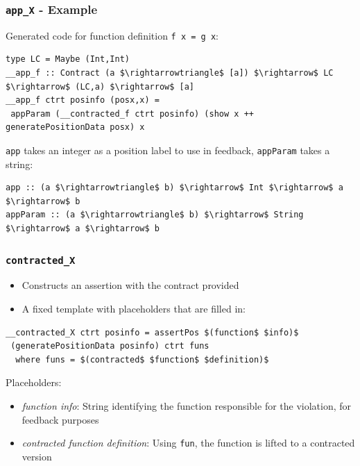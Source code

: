 \documentclass[]{beamer}
\begin{document}
\begin{frame}[fragile]
\frametitle{\texttt{\underline{\hspace{1.5em}}app\_X} - Example}

Generated code for function definition \texttt{f x = g x}:

\begin{lstlisting}[mathescape]
type LC = Maybe (Int,Int)
__app_f :: Contract (a $\rightarrowtriangle$ [a]) $\rightarrow$ LC $\rightarrow$ (LC,a) $\rightarrow$ [a]
__app_f ctrt posinfo (posx,x) =
 appParam (__contracted_f ctrt posinfo) (show x ++ generatePositionData posx) x
\end{lstlisting}

\texttt{app} takes an integer as a position label to use in feedback, \texttt{appParam} takes a string:

\begin{lstlisting}[mathescape]
app :: (a $\rightarrowtriangle$ b) $\rightarrow$ Int $\rightarrow$ a $\rightarrow$ b
appParam :: (a $\rightarrowtriangle$ b) $\rightarrow$ String $\rightarrow$ a $\rightarrow$ b
\end{lstlisting}

\end{frame}

\begin{frame}[fragile]
\frametitle{\texttt{\underline{\hspace{1.5em}}contracted\_X}}

\begin{itemize}
	\item Constructs an assertion with the contract provided
	\item A fixed template with placeholders that are filled in:
\end{itemize}

\begin{lstlisting}[mathescape]
__contracted_X ctrt posinfo = assertPos $(function$ $info)$ 
 (generatePositionData posinfo) ctrt funs
  where funs = $(contracted$ $function$ $definition)$
\end{lstlisting}

Placeholders:
\begin{itemize}
	\item \textit{function info}: String identifying the function responsible for the violation, for feedback purposes
	\item \textit{contracted function definition}: Using \texttt{fun}, the function is lifted to a contracted version
\end{itemize}

\end{frame}
\end{document}
